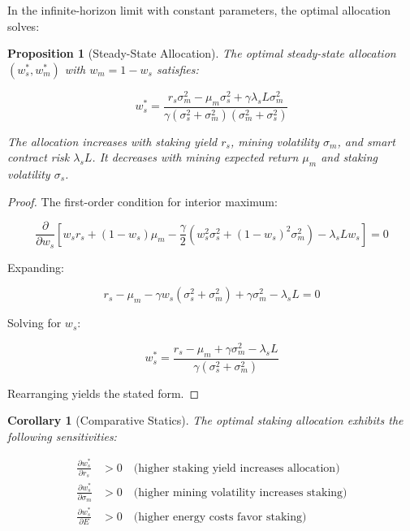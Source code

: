 \documentclass[
  journal=medium,
  manuscript=article-type,
  year=2025,
  volume=1,
]{cup-journal}
\newtheorem{proposition}[theorem]{Proposition}
\newtheorem{corollary}[theorem]{Corollary}
\theoremstyle{definition}
\begin{document}
In the infinite-horizon limit with constant parameters, the optimal allocation solves:

\begin{proposition}[Steady-State Allocation]
The optimal steady-state allocation $(w_s^*, w_m^*)$ with $w_m = 1 - w_s$ satisfies:

\begin{equation}
w_s^* = \frac{r_s \sigma_m^2 - \mu_m \sigma_s^2 + \gamma \lambda_s L \sigma_m^2}{\gamma(\sigma_s^2 + \sigma_m^2)(\sigma_m^2 + \sigma_s^2)}
\end{equation}

The allocation increases with staking yield $r_s$, mining volatility $\sigma_m$, and smart contract risk $\lambda_s L$. It decreases with mining expected return $\mu_m$ and staking volatility $\sigma_s$.
\end{proposition}

\begin{proof}
The first-order condition for interior maximum:

\begin{equation}
\frac{\partial}{\partial w_s} \left[ w_s r_s + (1-w_s) \mu_m - \frac{\gamma}{2}(w_s^2 \sigma_s^2 + (1-w_s)^2 \sigma_m^2) - \lambda_s L w_s \right] = 0
\end{equation}

Expanding:

\begin{equation}
r_s - \mu_m - \gamma w_s(\sigma_s^2 + \sigma_m^2) + \gamma \sigma_m^2 - \lambda_s L = 0
\end{equation}

Solving for $w_s$:

\begin{equation}
w_s^* = \frac{r_s - \mu_m + \gamma \sigma_m^2 - \lambda_s L}{\gamma(\sigma_s^2 + \sigma_m^2)}
\end{equation}

Rearranging yields the stated form.
\end{proof}

\begin{corollary}[Comparative Statics]
The optimal staking allocation exhibits the following sensitivities:

\begin{align}
\frac{\partial w_s^*}{\partial r_s} &> 0 \quad \text{(higher staking yield increases allocation)} \\
\frac{\partial w_s^*}{\partial \sigma_m} &> 0 \quad \text{(higher mining volatility increases staking)} \\
\frac{\partial w_s^*}{\partial E} &> 0 \quad \text{(higher energy costs favor staking)}
\end{align}
\end{corollary}
\end{document}
